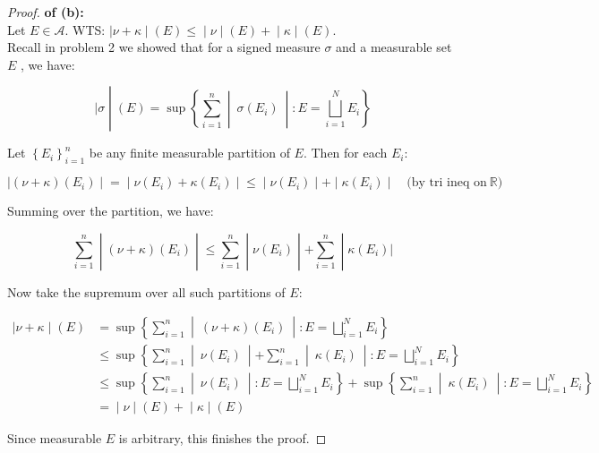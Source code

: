 \begin{proof}

\textbf{of (b):}\\
Let \(E \in \mathcal{A}\). WTS: \(\left. |\nu + \kappa \middle| (E) \leq \middle| \nu \middle| (E) + \middle| \kappa \middle| (E) \right.\).\\
Recall in problem 2 we showed that for a signed measure \(\sigma\) and a measurable set \(E\) , we have:

\[\left. |\sigma \middle| (E) = \sup\left\{ \sum\limits_{i = 1}^{n} \middle| \ \sigma(E_{i})\  \middle| :E = \bigsqcup\limits_{i = 1}^{N}E_{i} \right\} \right.\]

Let \(\left\{ E_{i} \right\}_{i = 1}^{n}\) be any finite measurable partition of \(E\). Then for each \(E_{i}\):

\[\left. |(\nu + \kappa)(E_{i}) \middle| = \middle| \nu(E_{i}) + \kappa(E_{i}) \middle| \leq \middle| \nu(E_{i}) \middle| + \middle| \kappa(E_{i}) \middle| \quad\text{(by tri ineq on}\ \mathbb{R}\text{)} \right.\]

Summing over the partition, we have:

\[\left. \sum\limits_{i = 1}^{n} \middle| (\nu + \kappa)(E_{i}) \middle| \leq \sum\limits_{i = 1}^{n} \middle| \nu(E_{i}) \middle| + \sum\limits_{i = 1}^{n} \middle| \kappa(E_{i})| \right.\]

Now take the supremum over all such partitions of \(E\):

\[\begin{matrix}
\left. |\nu + \kappa \middle| (E) \right. & {= \sup\left\{ \sum\limits_{i = 1}^{n} \middle| \ (\nu + \kappa)(E_{i})\  \middle| :E = \bigsqcup\limits_{i = 1}^{N}E_{i} \right\}} \\
 & {\leq \sup\left\{ \sum\limits_{i = 1}^{n} \middle| \ \nu(E_{i})\  \middle| + \sum\limits_{i = 1}^{n} \middle| \ \kappa(E_{i})\  \middle| :E = \bigsqcup\limits_{i = 1}^{N}E_{i} \right\}} \\
 & {\leq \sup\left\{ \sum\limits_{i = 1}^{n} \middle| \ \nu(E_{i})\  \middle| :E = \bigsqcup\limits_{i = 1}^{N}E_{i} \right\} + \sup\left\{ \sum\limits_{i = 1}^{n} \middle| \ \kappa(E_{i})\  \middle| :E = \bigsqcup\limits_{i = 1}^{N}E_{i} \right\}} \\
 & \left. = \middle| \nu \middle| (E) + \middle| \kappa \middle| (E) \right.
\end{matrix}\]

Since measurable \(E\) is arbitrary, this finishes the proof.

\end{proof}

